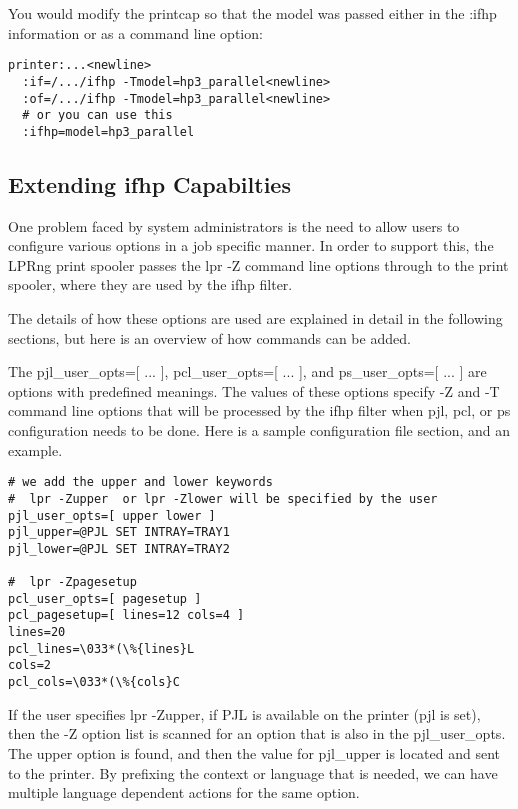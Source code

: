 \documentclass[a4paper]{article}
\begin{document}
You would modify the printcap so that the model was passed
either in the
{\ttfamily :ifhp} information or as a command line option:
\begin{tscreen}
\begin{verbatim}
printer:...<newline>
  :if=/.../ifhp -Tmodel=hp3_parallel<newline>
  :of=/.../ifhp -Tmodel=hp3_parallel<newline>
  # or you can use this
  :ifhp=model=hp3_parallel
\end{verbatim}
\end{tscreen}



\subsection{Extending ifhp Capabilties
\label{ps_user_opts}
\label{pcl_user_opts}}

One problem faced by system administrators
is the need to allow users to configure various options in a job
specific manner.
In order to support this,
the LPRng print spooler passes the
{\ttfamily lpr -Z}
command line options through to the print spooler,
where they are used by the
{\ttfamily ifhp}
filter.

The details of how these options are used are explained in detail
in the following sections,
but here is an overview of how commands can be added.

The
{\ttfamily pjl\_user\_opts=[ ... ]},
{\ttfamily pcl\_user\_opts=[ ... ]},
and
{\ttfamily ps\_user\_opts=[ ... ]}
are options with predefined meanings.
The values of these options specify
{\ttfamily -Z}
and
{\ttfamily -T}
command line options that will be processed by the
{\ttfamily ifhp}
filter when
{\ttfamily pjl}, {\ttfamily pcl}, or {\ttfamily ps} configuration needs to be done.
Here is a sample configuration file section,
and an example.
\begin{tscreen}
\begin{verbatim}
# we add the upper and lower keywords
#  lpr -Zupper  or lpr -Zlower will be specified by the user
pjl_user_opts=[ upper lower ]
pjl_upper=@PJL SET INTRAY=TRAY1
pjl_lower=@PJL SET INTRAY=TRAY2

#  lpr -Zpagesetup
pcl_user_opts=[ pagesetup ]
pcl_pagesetup=[ lines=12 cols=4 ]
lines=20
pcl_lines=\033*(\%{lines}L
cols=2
pcl_cols=\033*(\%{cols}C
\end{verbatim}
\end{tscreen}


If the user specifies
{\ttfamily lpr -Zupper},
if
{\ttfamily PJL}
is available on the printer
({\ttfamily pjl} is set),
then the
{\ttfamily -Z}
option list is scanned for an option that is also in the
{\ttfamily pjl\_user\_opts}.
The
{\ttfamily upper}
option is found,
and then the value for
{\ttfamily pjl\_upper}
is located and sent to the printer.
By prefixing the context or language that is needed,
we can have multiple language dependent actions for the same option.
\end{document}
